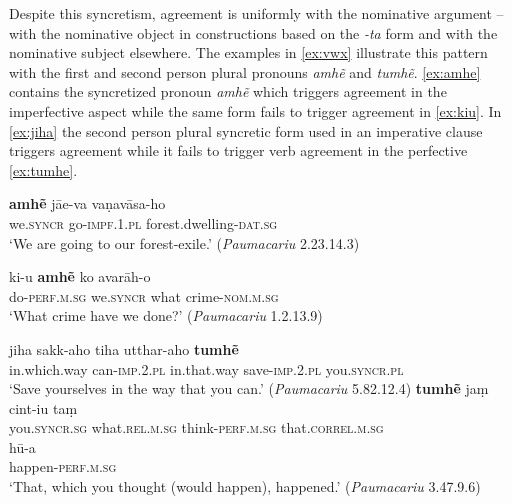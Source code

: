 \documentclass[output=paper,
modfonts
]{LSP/langsci}
\begin{document}
Despite this syncretism, agreement is uniformly with the nominative
argument -- with the nominative object in constructions based on the
\textit{-ta} form and with the nominative subject elsewhere. The examples
in \cref{ex:vwx} illustrate this pattern with the first and second person plural pronouns
\textit{amhẽ} and  \textit{tumhẽ}.  \cref{ex:amhe}
contains the syncretized pronoun \textit{amhẽ} which triggers
agreement in the imperfective aspect while the same form fails to
trigger agreement in \cref{ex:kiu}. In \cref{ex:jiha} the second person plural
syncretic form used in an imperative clause triggers agreement while it fails to trigger verb agreement in the perfective \cref{ex:tumhe}.


\begin{exe}
	\ex\label{ex:vwx}
\begin{xlist}
\ex\label{ex:amhe}\gll \textbf{amhẽ} jāe-va vaṇavāsa-ho \\
we.\textsc{syncr} go-\textsc{impf.1.pl} forest.dwelling-\textsc{dat.sg} \\
\glt `We are going to our forest-exile.' (\textit{Paumacariu} 2.23.14.3)

\ex\label{ex:kiu}\gll ki-u \textbf{amhẽ} ko avarāh-o \\
do-\textsc{perf.m.sg} we.\textsc{syncr} what crime-\textsc{nom.m.sg} \\
\glt `What crime have we done?' (\textit{Paumacariu} 1.2.13.9)

\ex\label{ex:jiha}\gll jiha sakk-aho tiha utthar-aho \textbf{tumhẽ}\\
in.which.way can-\textsc{imp.2.pl} in.that.way save-\textsc{imp.2.pl} you.\textsc{syncr.pl} \\
`Save yourselves in the way that you can.' (\textit{Paumacariu} 5.82.12.4)
\ex\label{ex:tumhe}\gll \textbf{tumhẽ} jaṃ cint-iu taṃ \\
you.\textsc{syncr.sg} what.\textsc{rel.m.sg} think-\textsc{perf.m.sg} that.\textsc{correl.m.sg} \\

\gll hū-a \\
happen-\textsc{perf.m.sg} \\
\glt `That, which  you thought (would happen),  happened.' (\textit{Paumacariu} 3.47.9.6)
\end{xlist}
\end{exe}
\end{document}
